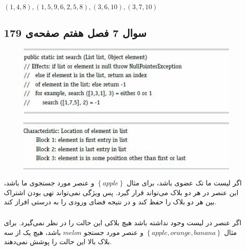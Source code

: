\documentclass{article}
\begin{document}
\subsubsection{}
\begin{latin}
$
(1,4,8), (1,5,9,6,2,5,8), (3,6,10), (3,7,10)
$
\end{latin}


\subsection{سوال 7 فصل هفتم صفحه‌ی 179}
















\begin{figure}[H]
    \centering
    \includegraphics[width=1.0\textwidth]{figures/1a.jpg}
    \caption
	{}
    \label{fig:fig1}
\end{figure}
\begin{figure}[H]
    \centering
    \includegraphics[width=1.0\textwidth]{figures/1b.jpg}
    \caption
	{}
    \label{fig:fig1}
\end{figure}
اگر لیست ما تک عضوی باشد، برای مثال $\left\{ apple \right\}$ و عنصر مورد جستجوی ما  باشد، این عنصر در هر دو بلاک می‌تواند قرار گیرد. پس ویژگی  نمی‌تواند تهی بودن اشتراک بین هر دو بلاک را حفظ کند و در نتیجه فضای ورودی را به درستی افراز کند.

\subsubsection{}
اگر عنصر در لیست وجود نداشته باشد هیچ بلاکی این حالت را در نظر نمی‌گیرد. برای مثال $\left\{ apple, orange, banana \right\}$ و عنصر مورد جستجو $melon$ باشد، هیچ یک از سه بلاک بالا این حالت را پوشش نمی‌دهند.
\end{document}
